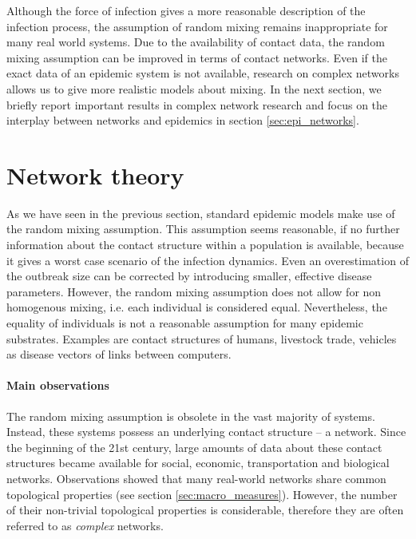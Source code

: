 Although the force of infection gives a more reasonable description of the infection process, the assumption of random mixing remains inappropriate for many real world systems.
Due to the availability of contact data, the random mixing assumption can be improved in terms of contact networks.
Even if the exact data of an epidemic system is not available, research on complex networks allows us to give more realistic models about mixing.
In the next section, we briefly report important results in complex network research and focus on the interplay between networks and epidemics in section \ref{sec:epi_networks}.


\section{Network theory}\label{sec:network_theory}
As we have seen in the previous section, standard epidemic models make use of the random mixing assumption.
This assumption seems reasonable, if no further information about the contact structure within a population is available, because it gives a worst case scenario of the infection dynamics.
Even an overestimation of the outbreak size can be corrected by introducing smaller, effective disease parameters.
However, the random mixing assumption does not allow for non homogenous mixing, i.e. each individual is considered equal.
Nevertheless, the equality of individuals is not a reasonable assumption for many epidemic substrates.
Examples are contact structures of humans, livestock trade, vehicles as disease vectors of links between computers.

\paragraph{Main observations\color{Cayenne}{.}}
The random mixing assumption is obsolete in the vast majority of systems.
Instead, these systems possess an underlying contact structure -- a network.
Since the beginning of the 21st century, large amounts of data about these contact structures became available for social, economic, transportation and biological networks.
Observations showed that many real-world networks share common topological properties (see section \ref{sec:macro_measures}).
However, the number of their non-trivial topological properties is considerable, therefore they are often referred to as \emph{complex} networks.

